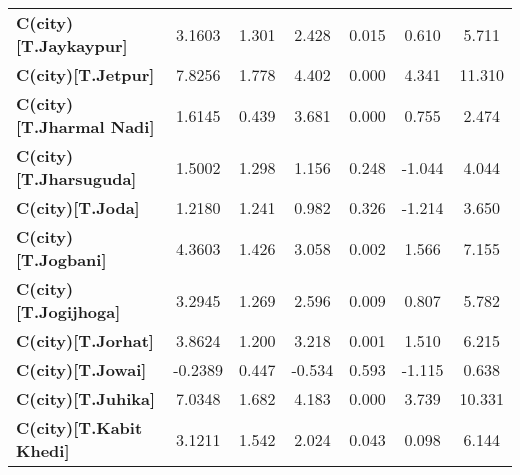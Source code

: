 \begin{center}
\begin{tabular}{lcccccc}
\textbf{C(city)[T.Jaykaypur]}                                                                       &       3.1603  &        1.301     &     2.428  &         0.015        &        0.610    &        5.711     \\
\textbf{C(city)[T.Jetpur]}                                                                          &       7.8256  &        1.778     &     4.402  &         0.000        &        4.341    &       11.310     \\
\textbf{C(city)[T.Jharmal Nadi]}                                                                    &       1.6145  &        0.439     &     3.681  &         0.000        &        0.755    &        2.474     \\
\textbf{C(city)[T.Jharsuguda]}                                                                      &       1.5002  &        1.298     &     1.156  &         0.248        &       -1.044    &        4.044     \\
\textbf{C(city)[T.Joda]}                                                                            &       1.2180  &        1.241     &     0.982  &         0.326        &       -1.214    &        3.650     \\
\textbf{C(city)[T.Jogbani]}                                                                         &       4.3603  &        1.426     &     3.058  &         0.002        &        1.566    &        7.155     \\
\textbf{C(city)[T.Jogijhoga]}                                                                       &       3.2945  &        1.269     &     2.596  &         0.009        &        0.807    &        5.782     \\
\textbf{C(city)[T.Jorhat]}                                                                          &       3.8624  &        1.200     &     3.218  &         0.001        &        1.510    &        6.215     \\
\textbf{C(city)[T.Jowai]}                                                                           &      -0.2389  &        0.447     &    -0.534  &         0.593        &       -1.115    &        0.638     \\
\textbf{C(city)[T.Juhika]}                                                                          &       7.0348  &        1.682     &     4.183  &         0.000        &        3.739    &       10.331     \\
\textbf{C(city)[T.Kabit Khedi]}                                                                     &       3.1211  &        1.542     &     2.024  &         0.043        &        0.098    &        6.144     \\

\end{tabular}
\end{center}
